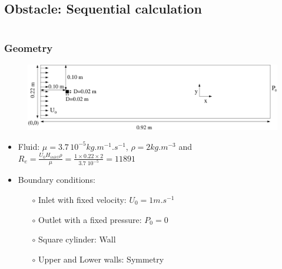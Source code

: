 \documentclass[10pt, hyperref={unicode=true,pdfusetitle, bookmarks=true,bookmarksnumbered=false,bookmarksopen=false, breaklinks=false,pdfborder={0 0 1},backref=true,colorlinks=true,linkcolor=darkblue,pageanchor}]{beamer}
\begin{document}
\subsection{Obstacle: Sequential calculation}
\begin{frame}
\begin{columns}[c] 
\tableofcontents[sections={1-9},currentsection, currentsubsection]
\tableofcontents[sections={10-16},currentsection, currentsubsection]
\end{columns}
\end{frame}
\begin{frame}
\frametitle{Geometry}
\begin{block}{}

\begin{figure}
\includegraphics[width=1\textwidth]{PICTURES/Obstacle.pdf}
\end{figure}

\begin{itemize}
\item Fluid: $\mu=3.7 \, 10^{-5} kg.m^{-1}.s^{-1}$, $\rho=2 kg.m^{-3}$ and $R_e=\frac{U_0 H_{inlet} \rho}{\mu} = \frac{1 \times 0.22 \times 2}{3.7 \;10^{-5}} = 11 891$
\item Boundary conditions:\\
    \begin{itemize}
    \item [$\circ$] Inlet with fixed velocity: $U_0=1 m.s^{-1}$
    \item [$\circ$] Outlet with a fixed pressure: $P_0=0$
    \item [$\circ$] Square cylinder: Wall
    \item [$\circ$] Upper and Lower walls: Symmetry
    \end{itemize}
\end{itemize}

\end{block}
\end{frame}
\end{document}

